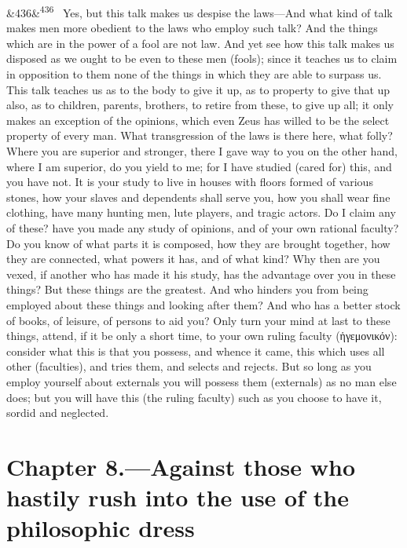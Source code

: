 \documentclass[12pt]{article}
\newcommand{\para}[1][]{\par\noindent\ifx&#1&\else\textsuperscript{\footnotesize #1}~\fi}
\begin{document}
\para[436] Yes, but this talk makes us despise the laws—And what kind of talk makes men more obedient to the laws who employ such talk? And the things which are in the power of a fool are not law. And yet see how this talk makes us disposed as we ought to be even to these men (fools); since it teaches us to claim in opposition to them none of the things in which they are able to surpass us. This talk teaches us as to the body to give it up, as to property to give that up also, as to children, parents, brothers, to retire from these, to give up all; it only makes an exception of the opinions, which even Zeus has willed to be the select property of every man. What transgression of the laws is there here, what folly? Where you are superior and stronger, there I gave way to you on the other hand, where I am superior, do you yield to me; for I have studied (cared for) this, and you have not. It is your study to live in houses with floors formed of various stones, how your slaves and dependents shall serve you, how you shall wear fine clothing, have many hunting men, lute players, and tragic actors. Do I claim any of these? have you made any study of opinions, and of your own rational faculty? Do you know of what parts it is composed, how they are brought together, how they are connected, what powers it has, and of what kind? Why then are you vexed, if another who has made it his study, has the advantage over you in these things? But these things are the greatest. And who hinders you from being employed about these things and looking after them? And who has a better stock of books, of leisure, of persons to aid you? Only turn your mind at last to these things, attend, if it be only a short time, to your own ruling faculty (ἡγεμονικόν): consider what this is that you possess, and whence it came, this which uses all other (faculties), and tries them, and selects and rejects. But so long as you employ yourself about externals you will possess them (externals) as no man else does; but you will have this (the ruling faculty) such as you choose to have it, sordid and neglected.

\section*{Chapter 8.---Against those who hastily rush into the use of the philosophic dress}
\end{document}
